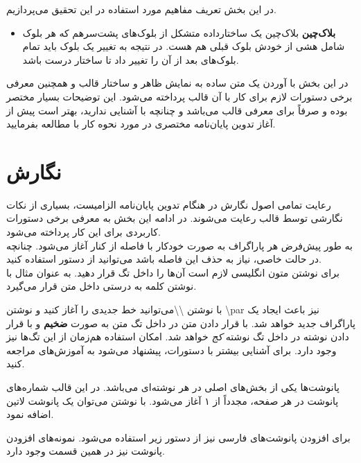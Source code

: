 \par
در این بخش تعریف مفاهیم مورد استفاده‌ در این تحقیق می‌پردازیم. 
\begin{itemize}
	\item 
	\textbf{بلاک‌چین}
	بلاک‌چین یک ساختارداده متشکل‌ از بلوک‌های پشت‌‌سرهم که هر بلوک شامل هشی از خودش بلوک قبلی هم هست. در نتیجه به تغییر یک بلوک باید تمام بلوک‌‌های بعد از آن را تغییر داد تا ساختار درست باشد. 
\end{itemize}

در این بخش با آوردن یک متن ساده به نمایش ظاهر و ساختار قالب و همچنین معرفی برخی دستورات لازم برای کار با آن قالب پرداخته می‌شود. این توضیحات بسیار مختصر بوده و صرفاً برای معرفی قالب می‌باشد و چنانچه با  آشنایی ندارید، بهتر است پیش از آغاز تدوین پایان‌نامه مختصری در مورد نحوه کار با  مطالعه بفرمایید.
\section{نگارش}
رعایت تمامی اصول نگارش در هنگام تدوین پایان‌نامه الزامیست، بسیاری از نکات نگارشی توسط قالب رعایت می‌شوند. در ادامه این بخش به معرفی برخی دستورات کاربردی برای این کار پرداخته می‌شود.
\\
به طور پیش‌‌فرض هر پاراگراف به صورت خودکار با فاصله  از کنار آغاز می‌شود.  چنانچه در حالت خاصی، نیاز به حذف این فاصله باشد می‌توانید از دستور 
 \RTL{}\noindent
استفاده کنید.\\
برای نوشتن متون انگلیسی لازم است آن‌ها را داخل تگ
 قرار دهید. به عنوان مثال با نوشتن 
 کلمه  به درستی داخل متن قرار می‌گیرد.
 \par
 با نوشتن \textbackslash\textbackslash می‌توانید خط جدیدی را آغاز کنید و نوشتن \textbackslash par نیز باعث ایجاد یک پاراگراف جدید خواهد شد. با قرار دادن متن در داخل تگ  متن به صورت \textbf{ضخیم} و با قرار دادن نوشته در داخل تگ  نوشته \textit{کج} خواهد شد. امکان استفاده هم‌زمان از این تگ‌ها نیز وجود دارد. برای آشنایی بیشتر با دستورات، پیشنهاد می‌شود به آموزش‌های  مراجعه کنید.
 \par

 پانوشت‌‌ها یکی از بخش‌های اصلی در هر نوشته‌ای می‌باشد. در این قالب شماره‌های پانوشت در هر صفحه، مجدداً از ۱ آغاز می‌شود.  با نوشتن
 \RTL{} \noindent
  می‌توان یک پانوشت لاتین اضافه نمود.
 \par
برای افزودن پانوشت‌های فارسی نیز از دستور زیر استفاده می‌شود.
 \RTL{} \noindent
نمونه‌های افزودن پانوشت نیز در همین قسمت وجود دارد.






